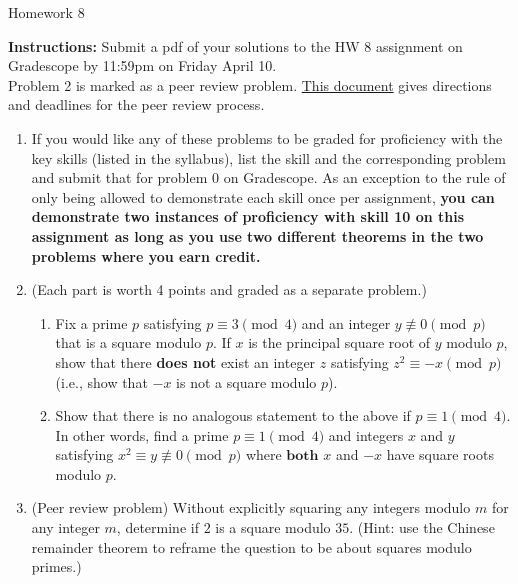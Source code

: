 \documentclass[12pt]{article}
\begin{document}
\begin{center}
{\Large Homework 8}\\


\end{center}
{\bf Instructions:} Submit a pdf of your solutions to the HW 8 assignment on Gradescope by 11:59pm on Friday April 10. \\[3pt]

\noindent Problem 2 is marked as a peer review problem. \href{https://docs.google.com/document/d/1jSw9pmMJJFUx_6dTkcUi4k4HJNIrrIIgs9zdWhAycx0/edit?usp=drive_link}{This document} gives directions and deadlines for the peer review process.
\\[3pt]


\begin{enumerate}
\item[0.] If you would like any of these problems to be graded for proficiency with the key skills (listed in the syllabus), list the skill and the corresponding problem and submit that for problem 0 on Gradescope.  As an exception to the rule of only being allowed to demonstrate each skill once per assignment,  {\bf you can demonstrate two instances of proficiency with skill 10 on this assignment as long as you use two different theorems in the two problems where you earn credit.}

\item (Each part is worth 4 points and
graded as a separate problem.)
\begin{enumerate}
\item 
Fix a prime $p$ satisfying $p \equiv 3 \pmod 4$ and an integer $y \not \equiv 0 \pmod p$ that is a square modulo $p$.  If $x$ is the principal square root of $y$ modulo $p$, show that there \textbf{does not} exist an integer $z$ satisfying $z^2 \equiv -x \pmod p$ (i.e., show that $-x$ is not a square modulo $p$).
\item Show that there is no analogous statement to the above if $p\equiv 1\pmod{4}$. In other words, find a prime $p\equiv 1\pmod4$ and  integers $x$ and $y$ satisfying $x^2 \equiv y \not \equiv 0 \pmod p$ where $\textbf{both}$ $x$ and $-x$ have square roots modulo $p$.
\end{enumerate}




\item (Peer review problem) Without explicitly squaring any integers modulo $m$ for any integer $m$, determine if $2$ is a square modulo $35$.  (Hint: use the Chinese remainder theorem to reframe the question to be about squares modulo primes.)




\end{enumerate}
\end{document}
